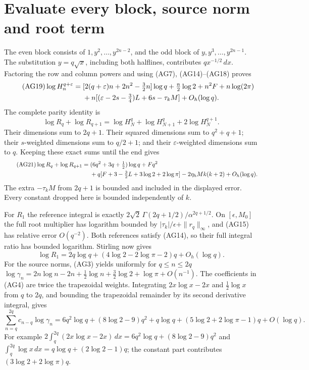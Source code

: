 \documentclass[11pt,a4paper]{article}
\providecommand{\dd}{\,d}
\begin{document}
\section{Evaluate every block, source norm and root term}
The even block consists of $1,y^2,\ldots,y^{2n-2}$, and the odd block of
$y,y^3,\ldots,y^{2n-1}$. The substitution $y=q\sqrt x$, including both
halflines, contributes $q x^{-1/2}\dd x$.
Factoring the row and column powers and using (AG7), (AG14)--(AG18) proves
\begin{align}\tag{AG19}
 \log H_n^{q+\varepsilon}
 ={}&[2(q+\varepsilon)n+2n^2-\tfrac32n]\log q
       +\tfrac n2\log2+n^2F+n\log(2\pi)\\
 &+n[(\varepsilon-2s-\tfrac34)L+6s-\tau_kM]
       +O_h(\log q).\notag
\end{align}
The complete parity identity is
\begin{equation}\tag{AG20}
 \log R_q+\log R_{q+1}
 =\log H_N^q+\log H_{N+1}^q+2\log H_N^{q+1}.
\end{equation}
Their dimensions sum to $2q+1$. Their squared dimensions sum to
$q^2+q+1$; their $s$-weighted dimensions sum to $q/2+1$;
and their $\varepsilon$-weighted dimensions sum to $q$.
Keeping these exact sums until the end gives
\begin{align}\tag{AG21}
 \log R_q+\log R_{q+1}
 ={}&(6q^2+3q+\tfrac12)\log q+Fq^2\\
 &+q[F+3-\tfrac32L+3\log2+2\log\pi]
       -2\eta_h M k(k+2)+O_h(\log q).\notag
\end{align}
The extra $-\tau_kM$ from $2q+1$ is bounded and included in the displayed
error. Every constant dropped here is bounded independently of $k$.

For $R_1$ the reference integral is exactly
$2\sqrt2\,\Gamma(2q+1/2)/\alpha^{2q+1/2}$.
On $[\epsilon,M_0]$ the full root multiplier has logarithm bounded by
$|\tau_k|/\epsilon+\|r_q\|_\infty$, and (AG15) has relative error $O(q^{-2})$.
Both references satisfy (AG14), so their full integral ratio has bounded
logarithm. Stirling now gives
\begin{equation}\tag{AG22}
 \log R_1=2q\log q+(4\log2-2\log\pi-2)q+O_h(\log q).
\end{equation}
For the source norms, (AG3) yields uniformly for $q\le n\le2q$
$\log\gamma_n=2n\log n-2n+\tfrac12\log n+\tfrac32\log2+\log\pi+O(n^{-1})$.
The coefficients in (AG4) are twice the trapezoidal weights. Integrating
$2x\log x-2x$ and $\tfrac12\log x$ from $q$ to $2q$, and bounding the
trapezoidal remainder by its second derivative integral, gives
\begin{equation}\tag{AG23}
 \sum_{n=q}^{2q}c_{n-q}\log\gamma_n
 =6q^2\log q+(8\log2-9)q^2
  +q\log q+(5\log2+2\log\pi-1)q+O(\log q).
\end{equation}
For example $2\int_q^{2q}(2x\log x-2x)\dd x
=6q^2\log q+(8\log2-9)q^2$ and
$\int_q^{2q}\log x\dd x=q\log q+(2\log2-1)q$;
the constant part contributes $(3\log2+2\log\pi)q$.
\end{document}
